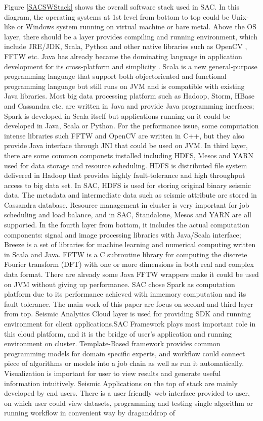 Figure \ref{SACSWStack} shows the overall software stack used in SAC. In this diagram, the operating systems at 1st level from bottom to top could be Unix-like or Windows system running on virtual machine or bare metal. Above the OS layer, there should be a layer provides compiling and running environment, which include JRE/JDK, Scala, Python and other native libraries such as OpenCV \cite{OpenCVMain}, FFTW \cite{Frigo05thedesign} etc. Java has already became the dominating language in application development for its cross-platform and simplicity \cite{Top10Lang}. Scala is a new general-purpose programming language that support both object\-oriented and functional programming language but still runs on JVM and is compatible with existing Java libraries. Most big data processing platform such as Hadoop, Storm, HBase and Cassandra etc. are written in Java and provide Java programming inerfaces; Spark is developed in Scala itself but applications running on it could be developed in Java, Scala or Python. For the performance issue, some computation intense libraries such FFTW and OpenCV are written in C++, but they also provide Java interface through JNI that could be used on JVM. In third layer, there are some common componets installed including HDFS, Mesos \cite{ApacheMesos} and YARN \cite{ApacheHadoop}  used for data storage and resource scheduling. HDFS is distributed file system delivered in Hadoop that provides highly fault-tolerance and high throughput access to big data set. In SAC, HDFS is used for storing original binary seismic data. The metadata and intermediate data such as seismic attribute are stored in Cassandra database. Resource management in cluster is very important for job scheduling and load balance, and in SAC, Standalone, Mesos and YARN are all supported. In the fourth layer from bottom, it includes the actual computation components: signal and image processing libraries with Java/Scala interface; Breeze \cite{ScalaNLPBreeze} is a set of libraries for machine learning and numerical computing written in Scala and Java. FFTW is a C subroutine library for computing the discrete Fourier transform (DFT) with one or more dimensions in both real and complex data format. There are already some Java FFTW wrappers make it could be used on JVM without giving up performance. SAC chose Spark as computation platform due to its performance achieved with in\-memory computation and its fault tolerance. The main work of this paper are focus on second and third layer from top. Seismic Analytics Cloud layer is used for providing SDK and running environment for client applications.SAC Framework plays most important role in this cloud platform, and it is the bridge of user's application and running environment on cluster. Template-Based framework provides common programming models for domain specific experts, and workflow could connect piece of algorithms or models into a job chain as well as run it automatically. Visualization is important for user to view results and generate useful information intuitively. Seismic Applications on the top of stack are mainly developed by end users. There is a user friendly web interface provided to user, on which user could view datasets, programming and testing single algorithm or running workflow in convenient way by drag\-and\-drop of 